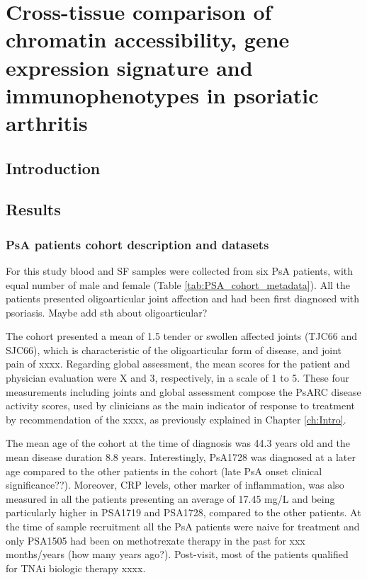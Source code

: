 \chapter{Cross-tissue comparison of chromatin accessibility, gene expression signature and immunophenotypes in psoriatic arthritis}
\label{ch:Results3}


\section{Introduction}
%

\section{Results}
%

\subsection{PsA patients cohort description and datasets}
For this study blood and SF samples were collected from six PsA patients, with equal number of male and female (Table \ref{tab:PSA_cohort_metadata}). All the patients presented oligoarticular joint affection and had been first diagnosed with psoriasis. Maybe add sth about oligoarticular?

The cohort presented a mean of 1.5 tender or swollen affected joints (TJC66 and SJC66), which is characteristic of the oligoarticular form of disease, and joint pain of xxxx. Regarding global assessment, the mean scores for the patient and physician evaluation were X and 3, respectively, in a scale of 1 to 5. These four measurements including joints and global assessment compose the PsARC disease activity scores, used by clinicians as the main indicator of response to treatment by recommendation of the xxxx, as previously explained in Chapter \ref{ch:Intro}. 

The mean age of the cohort at the time of diagnosis was 44.3 years old and the mean disease duration 8.8 years. Interestingly, PsA1728 was diagnosed at a later age compared to the other patients in the cohort (late PsA onset clinical significance??). Moreover, CRP levels, other marker of inflammation, was also measured in all the patients presenting an average of 17.45 mg/L and being particularly higher in PSA1719 and PSA1728, compared to the other patients. At the time of sample recruitment all the PsA patients were naive for treatment and only PSA1505 had been on methotrexate therapy in the past for xxx months/years (how many years ago?). Post-visit, most of the patients qualified for TNAi biologic therapy xxxx.



